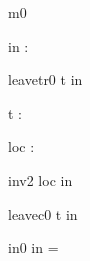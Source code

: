 \documentclass[12pt]{amsart}
\title{}
\author{}
\date{} %
\begin{document}
\maketitle
\tableofcontents


\begin{machine}{m0}


%
	\begin{variable}
		in : \set[\TRAIN]
	\end{variable}
%



\begin{transient}{leave}{tr0}
	t \in in
\end{transient}

\begin{dummy}
	t : \TRAIN
\end{dummy}

\begin{variable}
	loc : \TRAIN \pfun \BLK
\end{variable}

\begin{invariant}{inv2}
	loc \in in \tfun \BLK
\end{invariant}

\begin{cschedule}{leave}{c0}
	t \in in
\end{cschedule}

\begin{initialization}{in0}
	in = \emptyset
\end{initialization}

\begin{use:set}{\TRAIN} \end{use:set}
\begin{use:set}{\LOC} \end{use:set}
\begin{use:fun}{\TRAIN}{\LOC} \end{use:fun}


\end{machine}
\end{document}
